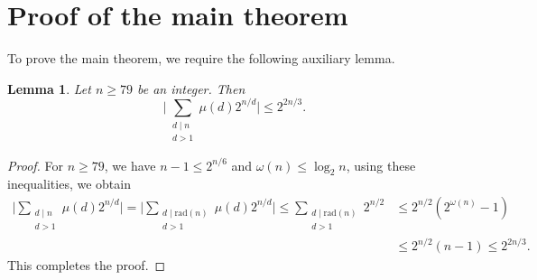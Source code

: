 \documentclass[12pt,reqno]{amsart}
\newtheorem{lemma} [theorem]{Lemma}
\begin{document}
\section{Proof of the main theorem}
To prove the main theorem, we require the following auxiliary lemma.
\begin{lemma}\label{Lemma 2} Let $n\geq 79$ be an integer. Then
$$\bigg| \sum_{\substack{d \mid n\\d>1}} \mu(d) 2^{n/d}\bigg|\leq 2^{2n/3}.$$    
\end{lemma}
\begin{proof} For $n\geq79$, we have $n-1\leq 2^{n/6}$ and $\omega(n)\leq \log_2n$, using these inequalities, we obtain
\begin{align*}
   \bigg| \sum_{\substack{d \mid n\\d>1}} \mu(d) 2^{n/d}\bigg|=\bigg|\sum_{\substack{d\mid \text{rad}(n)\\d>1}}\mu(d)2^{n/d}\bigg|\leq \sum_{\substack{d\mid \text{rad}(n)\\d>1}}2^{n/2}
   &\leq 2^{n/2}(2^{\omega(n)}-1)\\&\leq 2^{n/2}(n-1)\leq 2^{2n/3}.
\end{align*}
This completes the proof.
\end{proof}
\end{document}

